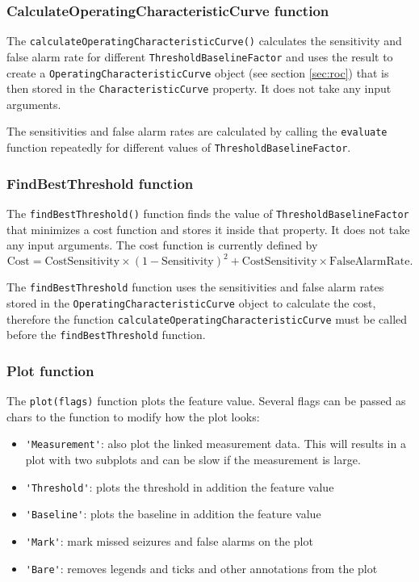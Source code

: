\documentclass[usletter, 11pt]{extarticle}
\begin{document}
\subsubsection{CalculateOperatingCharacteristicCurve function}

The \verb|calculateOperatingCharacteristicCurve()| calculates the sensitivity and false alarm rate for different \verb|ThresholdBaselineFactor| and uses the result to create a \verb|OperatingCharacteristicCurve| object (see section \ref{sec:roc}) that is then stored in the \verb|CharacteristicCurve| property. It does not take any input arguments.

The sensitivities and false alarm rates are calculated by calling the \verb|evaluate| function repeatedly for different values of \verb|ThresholdBaselineFactor|.

\subsubsection{FindBestThreshold function} 

The \verb|findBestThreshold()| function finds the value of \verb|ThresholdBaselineFactor| that minimizes a cost function and stores it inside that property. It does not take any input arguments. The cost function is currently defined by 
$$\text{Cost} = \text{CostSensitivity}\times(1-\text{Sensitivity})^2 + \text{CostSensitivity}\times\text{FalseAlarmRate}.$$

The \verb|findBestThreshold| function uses the sensitivities and false alarm rates stored in the
\texttt{Operating\-Charac\-teristic\-Curve} object to calculate the cost, therefore the function \texttt{calculate\-Operating\-Charac\-teristic\-Curve} must be called before the \verb|findBestThreshold| function.

\subsubsection{Plot function} \label{sec:feature_plot}

The \verb|plot(flags)| function plots the feature value. Several flags can be passed as chars to the function to modify how the plot looks:
\begin{itemize}
	\item \verb|'Measurement'|: also plot the linked measurement data. This will results in a plot with two subplots and can be slow if the measurement is large.
	\item \verb|'Threshold'|: plots the threshold in addition the feature value
	\item \verb|'Baseline'|: plots the baseline in addition the feature value
	\item \verb|'Mark'|: mark missed seizures and false alarms on the plot
	\item \verb|'Bare'|: removes legends and ticks and other annotations from the plot
\end{itemize}
\end{document}
